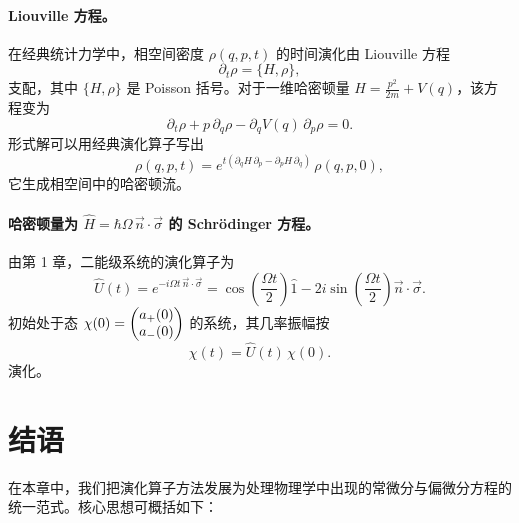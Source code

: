 \paragraph{Liouville 方程。}
在经典统计力学中，相空间密度 $\rho(q,p,t)$ 的时间演化由 Liouville 方程
\begin{equation}
\partial_{t}\rho=\{H,\rho\},
\label{eq:2.6.4}
\end{equation}
支配，其中 $\{H,\rho\}$ 是 Poisson 括号。对于一维哈密顿量 $H=\frac{p^{2}}{2m}+V(q)$，该方程变为
\begin{equation}
\partial_{t}\rho+p\,\partial_{q}\rho-\partial_{q}V(q)\,\partial_{p}\rho=0.
\label{eq:2.6.5}
\end{equation}
形式解可以用经典演化算子写出
\begin{equation}
\rho(q,p,t)=e^{t(\partial_{q}H\,\partial_{p}-\partial_{p}H\,\partial_{q})}\,\rho(q,p,0),
\label{eq:2.6.6}
\end{equation}
它生成相空间中的哈密顿流。

\paragraph{哈密顿量为 $\hat{H}=\hbar\Omega\,\vec{n}\cdot\vec{\sigma}$ 的 Schr\"odinger 方程。}
由第 1 章，二能级系统的演化算子为
\begin{equation}
\hat{U}(t)=e^{-i\Omega t\,\vec{n}\cdot\vec{\sigma}}
=\cos\!\left(\frac{\Omega t}{2}\right)\hat{1}
-2i\sin\!\left(\frac{\Omega t}{2}\right)\vec{n}\cdot\vec{\sigma}.
\label{eq:2.6.7}
\end{equation}
初始处于态 $\chi(0)=\begin{pmatrix}a_{+}(0)\\a_{-}(0)\end{pmatrix}$ 的系统，其几率振幅按
\begin{equation}
\chi(t)=\hat{U}(t)\,\chi(0).
\label{eq:2.6.8}
\end{equation}
演化。

\section{结语}

在本章中，我们把演化算子方法发展为处理物理学中出现的常微分与偏微分方程的统一范式。核心思想可概括如下：

